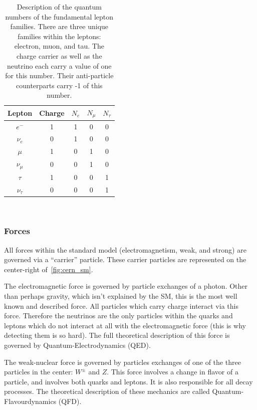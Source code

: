 \begin{table}
\begin{center}
\begin{tabular}{||c c c c c||}
 \hline
 Lepton & Charge & $N_{e}$ & $N_{\mu}$ & $N_{\tau}$ \\ [0.5ex]
 \hline\hline
 $e^{-}$ & 1 & 1 & 0 & 0 \\
 \hline
 $\nu_{e}$ & 0 & 1 & 0 & 0 \\
 \hline
 $\mu$ & 1 & 0 & 1 & 0 \\
 \hline
 $\nu_{\mu}$ & 0 & 0 & 1 & 0 \\
 \hline
 $\tau$ & 1 & 0 & 0 & 1 \\
 \hline
 $\nu_{\tau}$ & 0 & 0 & 0 & 1 \\
 \hline
\end{tabular}
\caption{Description of the quantum numbers of the fundamental lepton families. There are three unique families within the leptons: electron, muon, and tau. The charge carrier as well as the neutrino each carry a value of one for this number. Their anti-particle counterparts carry -1 of this number.}
\end{center}
\end{table}
~\label{table:lepton_qn}

\subsubsection{Forces}

All forces within the standard model (electromagnetism, weak, and strong) are governed via a ``carrier'' particle.
These carrier particles are represented on the center-right of~\ref{fig:cern_sm}.

The electromagnetic force is governed by particle exchanges of a photon.
Other than perhaps gravity, which isn't explained by the SM, this is the most well known and described force.
All particles which carry charge  interact via this force.
Therefore the neutrinos are the only particles within the quarks and leptons which do not interact at all with the electromagnetic force (this is why detecting them is so hard).
The full theoretical description of this force is governed by Quantum-Electrodynamics (QED).

The weak-nuclear force is governed by particles exchanges of one of the three particles in the center: $W^{\pm}$ and $Z$.
This force involves a change in flavor of a particle, and involves both quarks and leptons.
It is also responsible for all decay processes.
The theoretical description of these mechanics are called Quantum-Flavourdynamics (QFD).

